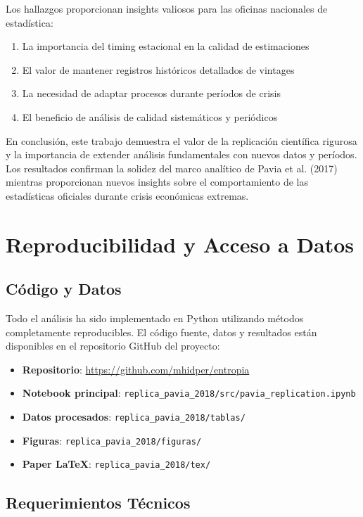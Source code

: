 \documentclass[12pt,a4paper]{article}
\begin{document}
Los hallazgos proporcionan insights valiosos para las oficinas nacionales de estadística:

\begin{enumerate}
\item La importancia del timing estacional en la calidad de estimaciones
\item El valor de mantener registros históricos detallados de vintages
\item La necesidad de adaptar procesos durante períodos de crisis
\item El beneficio de análisis de calidad sistemáticos y periódicos
\end{enumerate}

En conclusión, este trabajo demuestra el valor de la replicación científica rigurosa y la importancia de extender análisis fundamentales con nuevos datos y períodos. Los resultados confirman la solidez del marco analítico de Pavia et al. (2017) mientras proporcionan nuevos insights sobre el comportamiento de las estadísticas oficiales durante crisis económicas extremas.

\section{Reproducibilidad y Acceso a Datos}

\subsection{Código y Datos}

Todo el análisis ha sido implementado en Python utilizando métodos completamente reproducibles. El código fuente, datos y resultados están disponibles en el repositorio GitHub del proyecto:

\begin{itemize}
\item \textbf{Repositorio}: \url{https://github.com/mhidper/entropia}
\item \textbf{Notebook principal}: \texttt{replica\_pavia\_2018/src/pavia\_replication.ipynb}
\item \textbf{Datos procesados}: \texttt{replica\_pavia\_2018/tablas/}
\item \textbf{Figuras}: \texttt{replica\_pavia\_2018/figuras/}
\item \textbf{Paper LaTeX}: \texttt{replica\_pavia\_2018/tex/}
\end{itemize}

\subsection{Requerimientos Técnicos}
\end{document}
